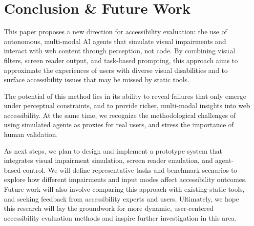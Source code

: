 
\section{Conclusion \& Future Work}

This paper proposes a new direction for accessibility evaluation: the use of autonomous, multi-modal \ac{AI} agents that simulate visual impairments and interact with web content through perception, not code. By combining visual filters, screen reader output, and task-based prompting, this approach aims to approximate the experiences of users with diverse visual disabilities and to surface accessibility issues that may be missed by static tools.

The potential of this method lies in its ability to reveal failures that only emerge under perceptual constraints, and to provide richer, multi-modal insights into web accessibility. At the same time, we recognize the methodological challenges of using simulated agents as proxies for real users, and stress the importance of human validation.

As next steps, we plan to design and implement a prototype system that integrates visual impairment simulation, screen reader emulation, and agent-based control. We will define representative tasks and benchmark scenarios to explore how different impairments and input modes affect accessibility outcomes. Future work will also involve comparing this approach with existing static tools, and seeking feedback from accessibility experts and users. Ultimately, we hope this research will lay the groundwork for more dynamic, user-centered accessibility evaluation methods and inspire further investigation in this area.